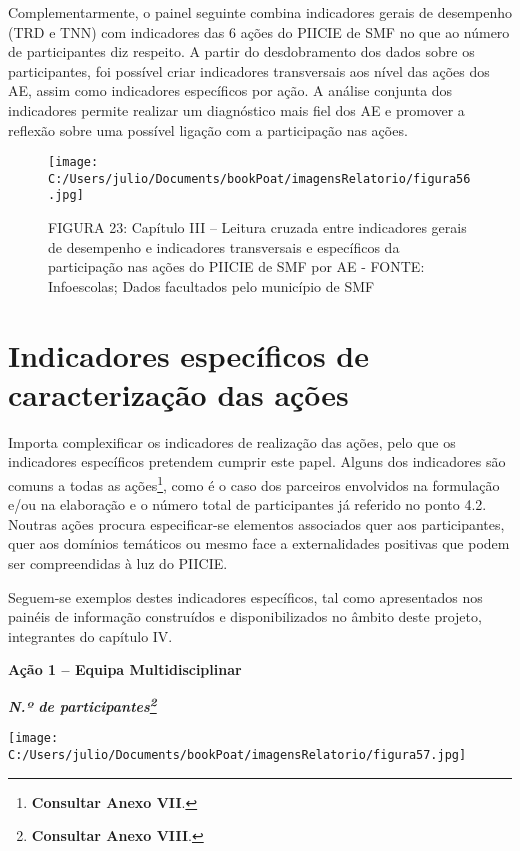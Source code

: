 \documentclass[
]{book}
\begin{document}
Complementarmente, o painel seguinte combina indicadores gerais de desempenho (TRD e TNN) com indicadores das 6 ações do PIICIE de SMF no que ao número de participantes diz respeito. A partir do desdobramento dos dados sobre os participantes, foi possível criar indicadores transversais aos nível das ações dos AE, assim como indicadores específicos por ação. A análise conjunta dos indicadores permite realizar um diagnóstico mais fiel dos AE e promover a reflexão sobre uma possível ligação com a participação nas ações.

\begin{figure}
\centering
\texttt{[image: C:/Users/julio/Documents/bookPoat/imagensRelatorio/figura56.jpg]}
\caption{FIGURA 23: Capítulo III -- Leitura cruzada entre indicadores gerais de desempenho e indicadores transversais e específicos da participação nas ações do PIICIE de SMF por AE - FONTE: Infoescolas; Dados facultados pelo município de SMF}
\end{figure}

\hypertarget{indicadores-especuxedficos-de-caracterizauxe7uxe3o-das-auxe7uxf5es}{%
\section{\texorpdfstring{\textbf{Indicadores específicos de caracterização das ações}}{Indicadores específicos de caracterização das ações}}\label{indicadores-especuxedficos-de-caracterizauxe7uxe3o-das-auxe7uxf5es}}

Importa complexificar os indicadores de realização das ações, pelo que os indicadores específicos pretendem cumprir este papel. Alguns dos indicadores são comuns a todas as ações\footnote{\textbf{Consultar Anexo VII}.}, como é o caso dos parceiros envolvidos na formulação e/ou na elaboração e o número total de participantes já referido no ponto 4.2. Noutras ações procura especificar-se elementos associados quer aos participantes, quer aos domínios temáticos ou mesmo face a externalidades positivas que podem ser compreendidas à luz do PIICIE.

Seguem-se exemplos destes indicadores específicos, tal como apresentados nos painéis de informação construídos e disponibilizados no âmbito deste projeto, integrantes do capítulo IV.

\textbf{Ação 1 -- Equipa Multidisciplinar}

\textbf{\emph{N.º de participantes\footnote{\textbf{Consultar Anexo VIII}.}}}

\texttt{[image: C:/Users/julio/Documents/bookPoat/imagensRelatorio/figura57.jpg]}
\end{document}
